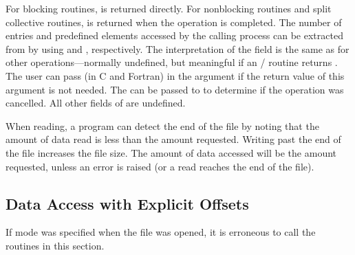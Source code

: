 For blocking routines,  is returned directly.
For nonblocking routines and split collective routines,
 is returned when the operation is completed.
The number of  entries and predefined elements accessed
by the calling process
can be extracted from  by using
 and
, respectively.
The interpretation of the  field is the same as for other
operations---normally undefined, but meaningful if an \MPI/ routine returns 
.
The user can pass (in C and
Fortran)
in the  argument
if the return value of this argument is not needed.
The  can be passed to 
to determine if the operation was cancelled.
All other fields of  are undefined.

When reading, a program can detect the end of the file
by noting that the amount of data read is less than the amount requested.
Writing past the end of the file increases the file size.
The amount of data accessed will be the amount requested,
unless an error is raised (or a read reaches the end of the file).

\subsection{Data Access with Explicit Offsets}
\label{sec:io-explicit}

If  mode was specified when the file was opened,
it is erroneous to call the routines in this section.

